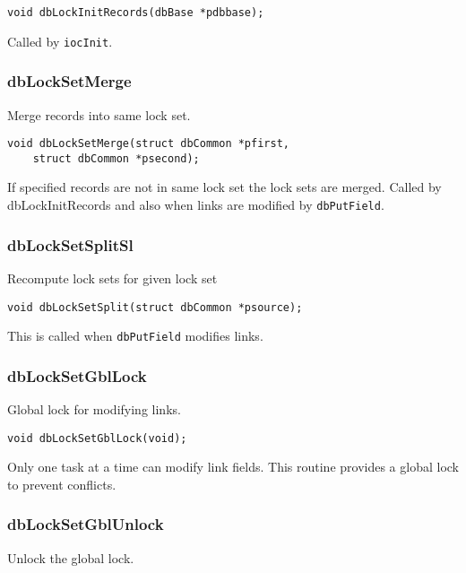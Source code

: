 \begin{verbatim}
void dbLockInitRecords(dbBase *pdbbase);
\end{verbatim}

Called by \verb|iocInit|.

\subsubsection{dbLockSetMerge}

Merge records into same lock set.

\begin{verbatim}
void dbLockSetMerge(struct dbCommon *pfirst,
    struct dbCommon *psecond);
\end{verbatim}

If specified records are not in same lock set the lock sets are merged.
Called by dbLockInitRecords and also when links are modified by \verb|dbPutField|.

\subsubsection{dbLockSetSplitSl}

Recompute lock sets for given lock set

\begin{verbatim}
void dbLockSetSplit(struct dbCommon *psource);
\end{verbatim}

This is called when \verb|dbPutField| modifies links.

\subsubsection{dbLockSetGblLock}

Global lock for modifying links.

\begin{verbatim}
void dbLockSetGblLock(void);
\end{verbatim}

Only one task at a time can modify link fields.
This routine provides a global lock to prevent conflicts.

\subsubsection{dbLockSetGblUnlock}

Unlock the global lock.

